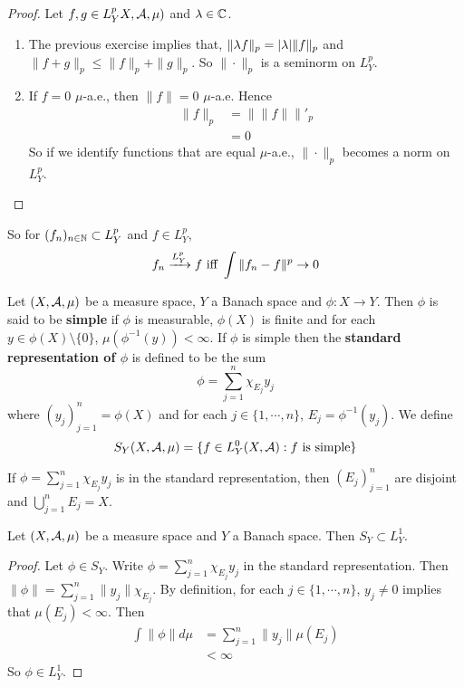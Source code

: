 \documentclass{book}
\begin{document}
	\begin{proof} 
	Let $f, g \in L^p_YX, \mathcal{A}, \mu)$ and $\lambda \in \mathbb{C}$. 
	\begin{enumerate}
	\item The previous exercise implies that, $\|\lambda f\|_p = |\lambda|\|f\|_p$ and $\|f+g\|_p \leq \|f\|_p + \|g \|_p$. So $\|\cdot\|_p$ is a seminorm on $L_Y^p$.
	\item If $f = 0$ $\mu$-a.e., then $\|f\| = 0$  $\mu$-a.e. Hence
	\begin{align*}
	\|f\|_p 
	&= \|\|f\|\|'_p \\
	&= 0
\end{align*}
	So if we identify functions that are equal $\mu$-a.e., $\|\cdot\|_p$ becomes a norm on $L^p_Y$. 	  
	\end{enumerate}
	\end{proof}
	
	\begin{note}
	So for $(f_n)_{n \in \mathbb{N}} \subset L^p_Y$ and $f \in L^p_Y$, $$f_n \xrightarrow{L^p_Y} f \text{ iff } \int \|f_n - f\|^p \rightarrow 0$$ 
	\end{note}
	
	\begin{defn}  
	Let $(X, \mathcal{A}, \mu)$ be a measure space, $Y$ a Banach space and $\phi: X \rightarrow Y$. Then $\phi$ is said to be \textbf{simple} if $\phi$ is measurable, $\phi(X)$ is finite and for each $y \in \phi(X) \setminus \{0\}$, $\mu(\phi^{-1}(y)) < \infty$. If $\phi$ is simple then the \textbf{standard representation of $\phi$} is defined to be the sum $$\phi = \sum\limits_{j=1}^n \chi_{E_j}y_j$$ where $(y_j)_{j=1}^n = \phi(X)$ and for each $j \in \{1, \cdots, n\}$, $E_j = \phi^{-1}(y_j)$. We define $$S_Y(X, \mathcal{A}, \mu) = \{f \in L_Y^0(X, \mathcal{A}): f \text{ is simple}\}$$
	\end{defn}
	
	\begin{note}
	If $\phi = \sum\limits_{j=1}^n \chi_{E_j}y_j$ is in the standard representation, then $(E_j)_{j=1}^n$ are disjoint and $\bigcup\limits_{j=1}^n E_j = X$.
	\end{note}
	
	\begin{ex}
	Let $(X, \mathcal{A}, \mu)$ be a measure space and $Y$ a Banach space. Then $S_Y \subset L^1_Y$. 
	\end{ex}
	
	\begin{proof}
	Let $\phi \in S_Y$. Write $\phi = \sum\limits_{j=1}^n \chi_{E_j}y_j$ in the standard representation. Then $\|\phi\| = \sum\limits_{j=1}^n \|y_j\|\chi_{E_j}$. By definition, for each $j \in \{1, \cdots, n\}$, $y_j \neq 0$ implies that $\mu(E_j) < \infty$. Then 
	\begin{align*}
	\int \|\phi\| d\mu 
	&= \sum\limits_{j=1}^n \|y_j\| \mu(E_j) \\
	&< \infty
	\end{align*}
	So $\phi \in L^1_Y$.
	\end{proof}
	
\end{document}
